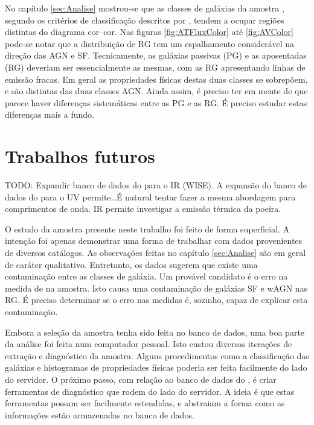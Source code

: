 No capítulo \ref{sec:Analise} mostrou-se que as classes de galáxias da amostra
\starlightUV, segundo os critérios de classificação descritos por
\citet{CidFernandes2011}, tendem a ocupar regiões distintas do diagrama
cor--cor. Nas figuras \ref{fig:ATFluxColor} até \ref{fig:AVColor} pode-se notar
que a distribuição de RG tem um espalhamento considerável na direção das AGN e
SF. Tecnicamente, as galáxias passivas (PG) e as aposentadas (RG) deveriam ser
essencialmente as mesmas, com as RG apresentando linhas de emissão fracas. Em
geral as propriedades físicas destas duas classes se sobrepõem, e são distintas
das duas classes AGN. Ainda assim, é preciso ter em mente de que parece haver
diferenças sistemáticas entre as PG e as RG. É preciso estudar estas diferenças
mais a fundo.



\section{Trabalhos futuros}

TODO: Expandir banco de dados do \starlight para o IR (WISE).
A expansão do banco de dados do \starlight para o UV permite\ldots É natural
tentar fazer a mesma abordagem para comprimentos de onda. IR permite investigar
a emissão térmica da poeira.

O estudo da amostra \starlightUV presente neste trabalho foi feito de forma
superficial. A intenção foi apenas demonstrar uma forma de trabalhar com dados
provenientes de diversos catálogos. As observações feitas no capítulo
\ref{sec:Analise} são em geral de caráter qualitativo. Entretanto, os dados
sugerem que existe uma contaminação entre as classes de galáxia. Um provável
candidato é o erro na medida de \WHa na amostra. Isto causa uma contaminação de
galáxias SF e wAGN nas RG. É preciso determinar se o erro nas medidas é,
sozinho, capaz de explicar esta contaminação.

Embora a seleção da amostra tenha sido feita no banco de dados, uma boa parte da
análise foi feita num computador pessoal. Isto custou diversas iterações de
extração e diagnóstico da amostra. Alguns procedimentos como a classificação das
galáxias e histogramas de propriedades físicas poderia ser feita facilmente do
lado do servidor. O próximo passo, com relação ao banco de dados do \starlight,
é criar ferramentas de diagnóstico que rodem do lado do servidor. A ideia é que
estas ferramentas possam ser facilmente estendidas, e abstraiam a forma como as
informações estão armazenadas no banco de dados.

